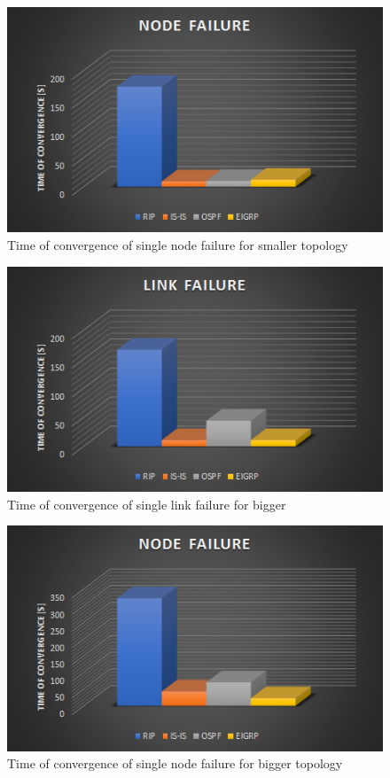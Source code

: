 \documentclass[conference,compsoc]{IEEEtran}
\begin{document}
\begin{figure}[!h]
  \centering
  \includegraphics[width=\columnwidth]{images/f4}
  \caption{Time of convergence of single node failure for smaller topology}
\end{figure}


\begin{figure}[!h]
  \centering
  \includegraphics[width=\columnwidth]{images/f5}
  \caption{Time of convergence of single link failure for bigger }
\end{figure}

\begin{figure}[!h]
  \centering
  \includegraphics[width=\columnwidth]{images/f6}
  \caption{Time of convergence of single node failure for bigger topology}
\end{figure}
\end{document}
